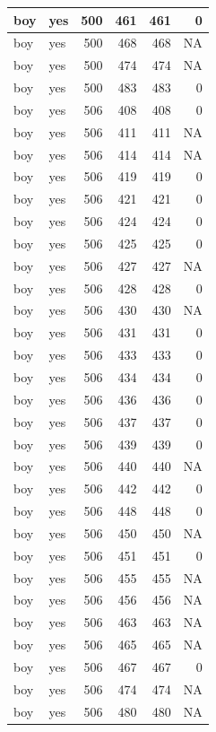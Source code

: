 \documentclass[man]{apa6}
\begin{document}
\begin{tabular}{l|l|r|r|r|r}
\hline
boy & yes & 500 & 461 & 461 & 0\\
\hline
boy & yes & 500 & 468 & 468 & NA\\
\hline
boy & yes & 500 & 474 & 474 & NA\\
\hline
boy & yes & 500 & 483 & 483 & 0\\
\hline
boy & yes & 506 & 408 & 408 & 0\\
\hline
boy & yes & 506 & 411 & 411 & NA\\
\hline
boy & yes & 506 & 414 & 414 & NA\\
\hline
boy & yes & 506 & 419 & 419 & 0\\
\hline
boy & yes & 506 & 421 & 421 & 0\\
\hline
boy & yes & 506 & 424 & 424 & 0\\
\hline
boy & yes & 506 & 425 & 425 & 0\\
\hline
boy & yes & 506 & 427 & 427 & NA\\
\hline
boy & yes & 506 & 428 & 428 & 0\\
\hline
boy & yes & 506 & 430 & 430 & NA\\
\hline
boy & yes & 506 & 431 & 431 & 0\\
\hline
boy & yes & 506 & 433 & 433 & 0\\
\hline
boy & yes & 506 & 434 & 434 & 0\\
\hline
boy & yes & 506 & 436 & 436 & 0\\
\hline
boy & yes & 506 & 437 & 437 & 0\\
\hline
boy & yes & 506 & 439 & 439 & 0\\
\hline
boy & yes & 506 & 440 & 440 & NA\\
\hline
boy & yes & 506 & 442 & 442 & 0\\
\hline
boy & yes & 506 & 448 & 448 & 0\\
\hline
boy & yes & 506 & 450 & 450 & NA\\
\hline
boy & yes & 506 & 451 & 451 & 0\\
\hline
boy & yes & 506 & 455 & 455 & NA\\
\hline
boy & yes & 506 & 456 & 456 & NA\\
\hline
boy & yes & 506 & 463 & 463 & NA\\
\hline
boy & yes & 506 & 465 & 465 & NA\\
\hline
boy & yes & 506 & 467 & 467 & 0\\
\hline
boy & yes & 506 & 474 & 474 & NA\\
\hline
boy & yes & 506 & 480 & 480 & NA\\

\end{tabular}
\end{document}
